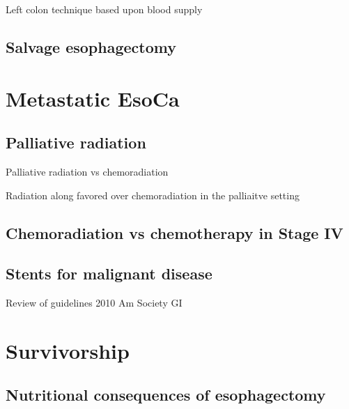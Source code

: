 \documentclass[
]{book}
\begin{document}
Left colon technique based upon blood supply \citep{peter858}

\hypertarget{salvage-esophagectomy}{%
\section{Salvage esophagectomy}\label{salvage-esophagectomy}}

\citep{markar922}

\citep{swisher175}

\hypertarget{eso_metastatic}{%
\chapter{Metastatic EsoCa}\label{eso_metastatic}}

\hypertarget{palliative-radiation}{%
\section{Palliative radiation}\label{palliative-radiation}}

Palliative radiation vs chemoradiation \citep{penniment114}

Radiation along favored over chemoradiation in the palliaitve setting \citep{penniment114}

\hypertarget{chemoradiation-vs-chemotherapy-in-stage-iv}{%
\section{Chemoradiation vs chemotherapy in Stage IV}\label{chemoradiation-vs-chemotherapy-in-stage-iv}}

\citep{guttmann1131}

\hypertarget{stents-for-malignant-disease}{%
\section{Stents for malignant disease}\label{stents-for-malignant-disease}}

\citep{vakil1791}

Review of guidelines 2010 Am Society GI \citep{sharma258}

\hypertarget{eso_survivorship}{%
\chapter{Survivorship}\label{eso_survivorship}}

\hypertarget{nutritional-consequences-of-esophagectomy}{%
\section{Nutritional consequences of esophagectomy}\label{nutritional-consequences-of-esophagectomy}}
\end{document}
